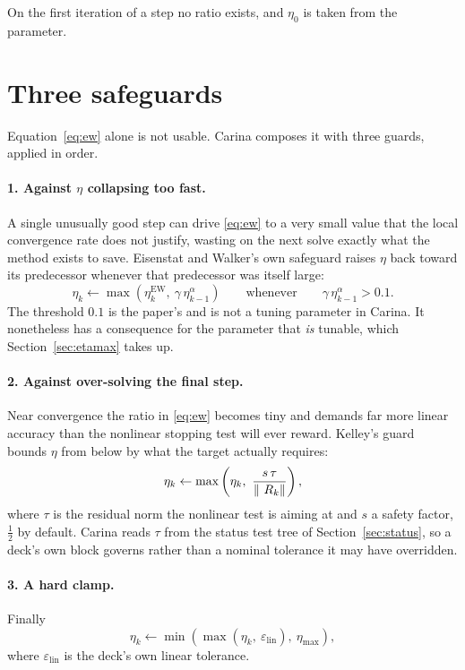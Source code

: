On the first iteration of a step no ratio exists, and $\eta_0$ is taken from
the  parameter.

\section{Three safeguards}
\label{sec:ew-safeguards}

Equation~\eqref{eq:ew} alone is not usable.  Carina composes it with three
guards, applied in order.

\paragraph{1. Against $\eta$ collapsing too fast.}  A single unusually good
step can drive \eqref{eq:ew} to a very small value that the local convergence
rate does not justify, wasting on the next solve exactly what the method exists
to save.  Eisenstat and Walker's own safeguard raises $\eta$ back toward its
predecessor whenever that predecessor was itself large:
\begin{equation}
  \eta_k \leftarrow \max\left(\eta_k^{\mathrm{EW}},\ \gamma\,\eta_{k-1}^{\alpha}\right)
  \qquad\text{whenever}\qquad \gamma\,\eta_{k-1}^{\alpha} > 0.1 .
  \label{eq:ew-guard}
\end{equation}
The threshold $0.1$ is the paper's and is not a tuning parameter in Carina.  It
nonetheless has a consequence for the parameter that \emph{is} tunable, which
Section~\ref{sec:etamax} takes up.

\paragraph{2. Against over-solving the final step.}  Near convergence the ratio
in \eqref{eq:ew} becomes tiny and demands far more linear accuracy than the
nonlinear stopping test will ever reward.  Kelley's guard~\cite{Kelley1995}
bounds $\eta$ from below by what the target actually requires:
\begin{equation}
  \eta_k \leftarrow \max\left(\eta_k,\ \frac{s\,\tau}{\norm{\Rvec_k}}\right),
  \label{eq:kelley}
\end{equation}
where $\tau$ is the residual norm the nonlinear test is aiming at and $s$ a
safety factor, $\tfrac12$ by default.  Carina reads $\tau$ from the status test
tree of Section~\ref{sec:status}, so a deck's own  block
governs rather than a nominal tolerance it may have overridden.

\paragraph{3. A hard clamp.}  Finally
\begin{equation}
  \eta_k \leftarrow \min\left(\max\left(\eta_k,\ \varepsilon_{\mathrm{lin}}\right),\ \eta_{\max}\right),
  \label{eq:clamp}
\end{equation}
where $\varepsilon_{\mathrm{lin}}$ is the deck's own linear tolerance.

